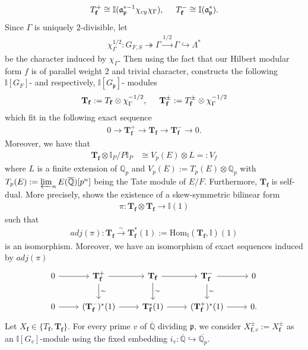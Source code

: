 \documentclass[reqno,10pt]{amsart}
\newcommand{\qp}{\mathbb{Q}_{p}}
\newcommand{\q}{\mathbb{Q}}
\newcommand{\I}{\mathbb{I}}
\newcommand{\f}{\mathbf{f}}
\newcommand{\T}{\mathbf{T}}
\newcommand{\ma}{\mathfrak{a}}
\newcommand{\p}{\mathfrak{p}}
\theoremstyle{plain}
\theoremstyle{definition}
\begin{document}
\begin{align*}
    T_\f^+ \cong \I(\ma_\p^{*-1}\chi_{cy}\chi_\Gamma), \hspace{5mm} T_\f^- \cong \I(\ma_\p^*).
\end{align*}
Since $\Gamma$ is uniquely 2-divisible, let
\begin{align*}
    \chi_\Gamma^{1/2} : G_{F,S} \twoheadrightarrow \Gamma \xrightarrow{1/2} \Gamma \hookrightarrow \Lambda^*
\end{align*}
be the character induced by $\chi_\Gamma$. Then using the fact that our Hilbert modular form $f$ is of parallel weight 2 and trivial character, \cite[Section 12.7]{Nekovar} constructs the following $\I[G_F]$- and respectively, $\I[G_\p]$- modules
\begin{align*}
    \T_\f := T_\f \otimes \chi_\Gamma^{-1/2}, \hspace{5mm} \T_\f^\pm := T_\f^\pm \otimes \chi_\Gamma^{-1/2}
\end{align*}
which fit in the following exact sequence
\begin{align*}
    0 \rightarrow \T_\f^+ \rightarrow \T_\f \rightarrow \T_\f^- \rightarrow 0.
\end{align*}
Moreover, we have that
\begin{align*}
    \T_\f \otimes \I_P/P\I_P & \cong V_p(E) \otimes L =: V_f
\end{align*}
where $L$ is a finite extension of $\qp$ and $V_p(E) := T_p(E) \otimes \qp$ with $T_p(E) := \varprojlim_n E(\overline{\q})[p^n]$ being the Tate module of $E/F$. Furthermore, $\T_\f$ is self-dual. More precisely, \cite[Section 12.7.12]{Nekovar} shows the existence of a skew-symmetric bilinear form
\begin{align*}
    \pi : \T_\f \otimes \T_\f \rightarrow \I(1)
\end{align*}
such that
\begin{align*}
    adj(\pi) : \T_\f \xrightarrow{\sim} \T_\f^*(1) := \mathrm{Hom}_{\I}(\T_\f,\I)(1)
\end{align*}
is an isomorphism. Moreover, we have an isomorphism of exact sequences induced by $adj(\pi)$
$$
\begin{tikzcd}
	0 \arrow[r] & 
    \T_\f^+ \arrow[r] \arrow[d,"\sim"] &
	\T_\f \arrow[r,'] \arrow[d,"\sim"] &
	\T_\f^- \arrow[r] \arrow[d,"\sim"] &
	0
	\\
	0 \arrow[r] &
	(\T_\f^-)^*(1) \arrow[r] &
	\T_\f^*(1) \arrow[r] &
	(\T_\f^+)^*(1) \arrow[r] &
	0.
\end{tikzcd}
$$
Let $X_\f \in \{T_\f,\T_\f\}$. For every prime $v$ of $\overline{\q}$ dividing $\p$, we consider $X_{\f,v}^\pm := X_\f^\pm$  as an $\I[G_v]$-module using the fixed embedding $i_v : \overline{\q} \hookrightarrow \overline{\qp}$.
\end{document}
